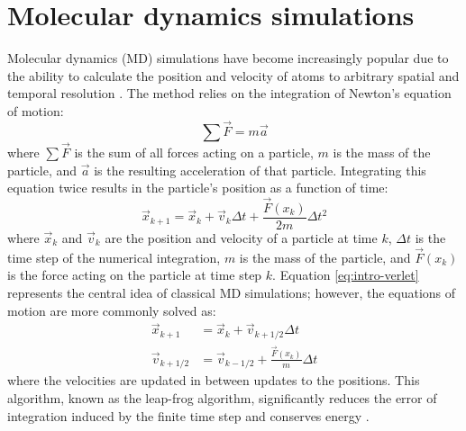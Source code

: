 \section{Molecular dynamics simulations}

Molecular dynamics (MD) simulations have become increasingly popular due to the ability to calculate the position and velocity of atoms to arbitrary spatial and temporal resolution \cite{Frenkel2002Understanding, Leach2001Molecular}. 
The method relies on the integration of Newton's equation of motion: 
\begin{equation}
    \sum \vec{F} = m \vec{a} 
\end{equation}
where $\sum \vec{F}$ is the sum of all forces acting on a particle, $m$ is the mass of the particle, and $\vec{a}$ is the resulting acceleration of that particle. 
Integrating this equation twice results in the particle's position as a function of time: 
\begin{equation}
    \vec{x}_{k+1} = \vec{x}_k + \vec{v}_k \Delta t + \frac{\vec{F}(x_k)}{2m} \Delta t^2
    \label{eq:intro-verlet}
\end{equation}
where $\vec{x}_k$ and $\vec{v}_k$ are the position and velocity of a particle at time $k$,  $\Delta t$ is the time step of the numerical integration, $m$ is the mass of the particle, and $\vec{F}(x_k)$ is the force acting on the particle at time step $k$. 
Equation \ref{eq:intro-verlet} represents the central idea of classical MD simulations; 
however, the equations of motion are more commonly solved as: 
\begin{equation}
    \begin{split}
        \vec{x}_{k+1} &= \vec{x}_k + \vec{v}_{k+1/2} \Delta t \\
        \vec{v}_{k+1/2} &= \vec{v}_{k-1/2}+ \frac{\vec{F}(x_k)}{m}\Delta t 
    \end{split}
    \label{eq:intro-leapfrog}
\end{equation}
where the velocities are updated in between updates to the positions. 
This algorithm, known as the leap-frog algorithm, significantly reduces the error of integration induced by the finite time step and conserves energy \cite{Hockney1974, Berendsen1986}.

